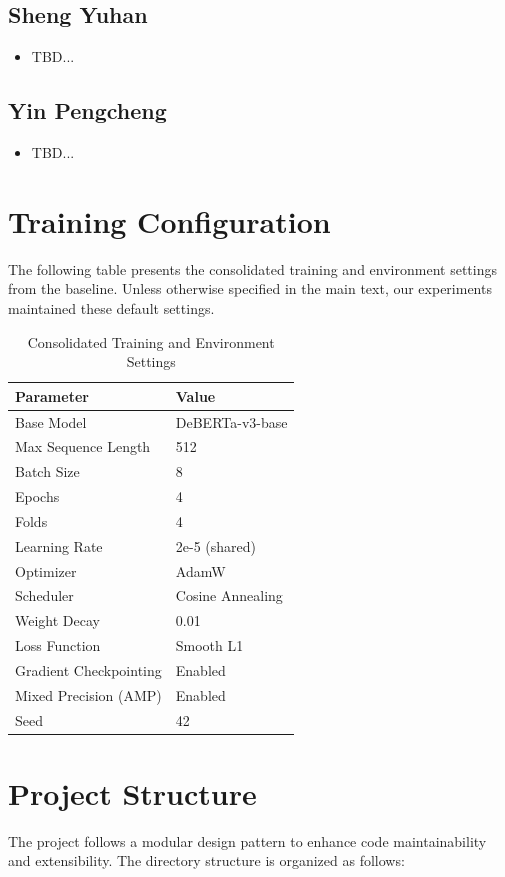 \documentclass[12pt]{article}
\begin{document}
\subsection*{Sheng Yuhan}
\begin{itemize}
    \item TBD...
\end{itemize}

\subsection*{Yin Pengcheng}
\begin{itemize}
    \item TBD...
\end{itemize}

\section{Training Configuration}
\label{app:train_config}
The following table presents the consolidated training and environment settings from the baseline. Unless otherwise specified in the main text, our experiments maintained these default settings.

\begin{table}[H]
\centering
\caption{Consolidated Training and Environment Settings}
\label{tab:train_config}
\begin{tabular}{ll}
\hline
\textbf{Parameter} & \textbf{Value} \\
\hline
Base Model & DeBERTa-v3-base \\
Max Sequence Length & 512 \\
Batch Size & 8 \\
Epochs & 4 \\
Folds & 4 \\
Learning Rate & 2e-5 (shared) \\
Optimizer & AdamW \\
Scheduler & Cosine Annealing \\
Weight Decay & 0.01 \\
Loss Function & Smooth L1 \\
Gradient Checkpointing & Enabled \\
Mixed Precision (AMP) & Enabled \\
Seed & 42 \\
\hline
\end{tabular}
\end{table}

\section{Project Structure}
\label{app:project-structure}
The project follows a modular design pattern to enhance code maintainability and extensibility. The directory structure is organized as follows:
\end{document}
